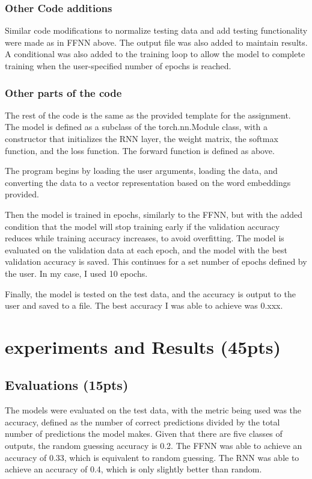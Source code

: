 \documentclass[conference]{IEEEtran}
\begin{document}
\subsubsection{Other Code additions}

Similar code modifications to normalize testing data and add testing functionality were made as in FFNN above. The output file was also added to maintain results. A conditional was also added to the training loop to allow the model to complete training when the user-specified number of epochs is reached.

\subsubsection{Other parts of the code}

The rest of the code is the same as the provided template for the assignment. The model is defined as a subclass of the torch.nn.Module class, with a constructor that initializes the RNN layer, the weight matrix, the softmax function, and the loss function. The forward function is defined as above. 

The program begins by loading the user arguments, loading the data, and converting the data to a vector representation based on the word embeddings provided.

Then the model is trained in epochs, similarly to the FFNN, but with the added condition that the model will stop training early if the validation accuracy reduces while training accuracy increases, to avoid overfitting. The model is evaluated on the validation data at each epoch, and the model with the best validation accuracy is saved. This continues for a set number of epochs defined by the user. In my case, I used 10 epochs.

Finally, the model is tested on the test data, and the accuracy is output to the user and saved to a file. The best accuracy I was able to achieve was 0.xxx.


\section{experiments and Results (45pts)}

\subsection{Evaluations (15pts)}

The models were evaluated on the test data, with the metric being used was the accuracy, defined as the number of correct predictions divided by the total number of predictions the model makes.
Given that there are five classes of outputs, the random guessing accuracy is 0.2. 
The FFNN was able to achieve an accuracy of 0.33, which is equivalent to random guessing. 
The RNN was able to achieve an accuracy of 0.4, which is only slightly better than random.
\end{document}
